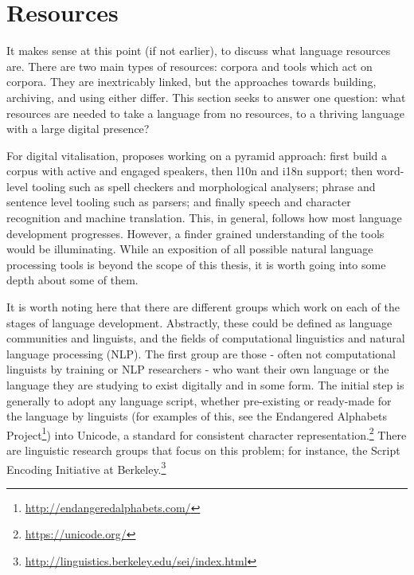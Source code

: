 \section{Resources}
\label{sec:resources}

It makes sense at this point (if not earlier), to discuss what language resources are. There are two main types of resources: corpora and tools which act on corpora. They are inextricably linked, but the approaches towards building, archiving, and using either differ. This section seeks to answer one question: what resources are needed to take a language from no resources, to a thriving language with a large digital presence?

For digital vitalisation, \citet{kornai2015new} proposes working on a pyramid approach: first build a corpus with active and engaged speakers, then l10n and i18n support; then word-level tooling such as spell checkers and morphological analysers; phrase and sentence level tooling such as parsers; and finally speech and character recognition and machine translation. This, in general, follows how most language development progresses. However, a finder grained understanding of the tools would be illuminating. While an exposition of all possible natural language processing tools is beyond the scope of this thesis, it is worth going into some depth about some of them.

It is worth noting here that there are different groups which work on each of the stages of language development. Abstractly, these could be defined as language communities and linguists, and the fields of computational linguistics and natural language processing (NLP). The first group are those - often not computational linguists by training or NLP researchers - who want their own language or the language they are studying to exist digitally and in some form. The initial step is generally to adopt any language script, whether pre-existing or ready-made for the language by linguists (for examples of this, see the Endangered Alphabets Project\footnote{\href{http://endangeredalphabets.com/}{http://endangeredalphabets.com/}}) into Unicode, a standard for consistent character representation.\footnote{\href{https://unicode.org/}{https://unicode.org/}} There are linguistic research groups that focus on this problem; for instance, the Script Encoding Initiative at Berkeley.\footnote{\href{http://linguistics.berkeley.edu/sei/index.html}{http://linguistics.berkeley.edu/sei/index.html}}

